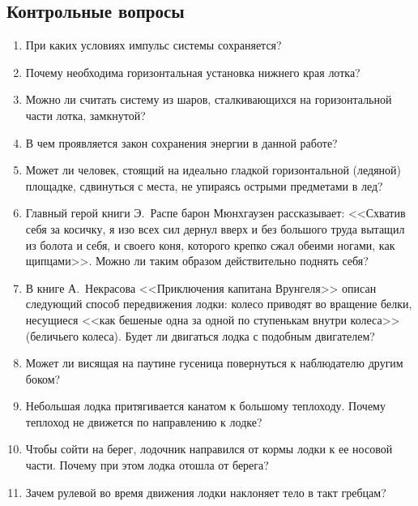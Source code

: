\documentclass[a4paper, 12pt]{extarticle}
\begin{document}
\subsection{Контрольные вопросы}
\begin{enumerate}
 \item При каких условиях импульс системы сохраняется?
 \item Почему необходима горизонтальная установка нижнего края лотка?
 \item
  Можно ли считать систему из шаров, сталкивающихся на горизонтальной части лотка, замкнутой?
  \item  %
   В чем проявляется закон сохранения энергии в данной работе?
   \item Может ли человек, стоящий на идеально гладкой горизонтальной (ледяной) площадке, сдвинуться с места, не упираясь острыми предметами в лед?  %
   \item Главный герой книги Э.~Распе барон Мюнхгаузен рассказывает: <<Схватив себя за косичку, я изо всех сил дернул вверх и без большого труда вытащил из болота и себя, и своего коня, которого крепко сжал обеими ногами, как щипцами>>. Можно ли таким образом действительно поднять себя?
   \item В книге А.~Некрасова <<Приключения капитана Врунгеля>> описан следующий способ передвижения лодки: колесо приводят во вращение белки, несущиеся <<как бешеные одна за одной по ступенькам внутри колеса>> (беличьего колеса). Будет ли двигаться лодка с подобным двигателем? %
   \item Может ли висящая на паутине гусеница повернуться к наблюдателю другим боком?
   \item Небольшая лодка притягивается канатом к большому теплоходу. Почему теплоход не движется по направлению к лодке? %
   \item Чтобы сойти на берег, лодочник направился от кормы лодки к ее носовой части. Почему при этом лодка отошла от берега?
   \item Зачем рулевой во время движения лодки наклоняет тело в такт гребцам? %
\end{enumerate}
\end{document}
